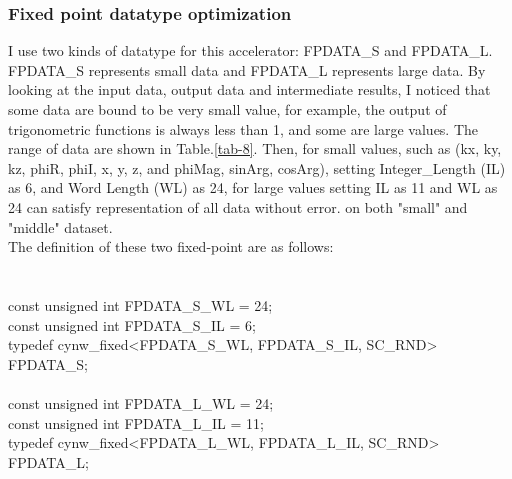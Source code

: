 \documentclass{sig-alternate}
\begin{document}
\subsubsection{Fixed point datatype optimization}

I use two kinds of datatype for this accelerator: FPDATA\_S and FPDATA\_L. FPDATA\_S represents small data and FPDATA\_L represents large data. By looking at the input data, output data and intermediate results, I noticed that some data are bound to be very small value, for example, the output of trigonometric functions is always less than 1, and some are large values. The range of data are shown in Table.\ref{tab-8}. Then, for small values, such as (kx, ky, kz, phiR, phiI, x, y, z, and phiMag, sinArg, cosArg), setting Integer\_Length (IL) as 6, and Word Length (WL) as 24, for large values setting IL as 11 and WL as 24 can satisfy representation of all data without error. on both "small" and "middle" dataset.\\
The definition of these two fixed-point are as follows:\\
\\
\\
const unsigned int FPDATA\_S\_WL = 24;\\
const unsigned int FPDATA\_S\_IL = 6;\\
typedef cynw\_fixed<FPDATA\_S\_WL, FPDATA\_S\_IL, SC\_RND> FPDATA\_S;\\
\\
const unsigned int FPDATA\_L\_WL = 24;\\
const unsigned int FPDATA\_L\_IL = 11;\\
typedef cynw\_fixed<FPDATA\_L\_WL, FPDATA\_L\_IL, SC\_RND> FPDATA\_L;\\
\\
\end{document}
